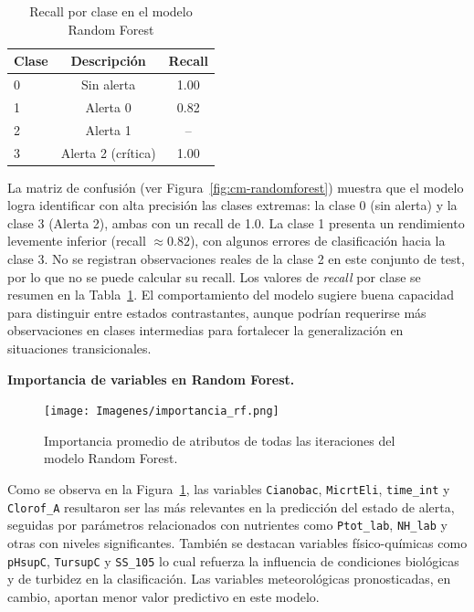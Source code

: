 \documentclass[11pt]{report}
\begin{document}
\begin{table}[H]
\centering
\caption{Recall por clase en el modelo Random Forest}
\label{tab:recall-rf}
\begin{tabular}{lcc}
\toprule
\textbf{Clase} & \textbf{Descripción} & \textbf{Recall} \\
\midrule
0 & Sin alerta           & 1.00 \\
1 & Alerta 0          & 0.82 \\
2 & Alerta 1         & -- \\
3 & Alerta 2 (crítica) & 1.00 \\
\bottomrule
\end{tabular}
\end{table}

La matriz de confusión (ver Figura~\ref{fig:cm-randomforest}) muestra que el modelo logra identificar con alta precisión las clases extremas: la clase 0 (sin alerta) y la clase 3 (Alerta 2), ambas con un recall de 1.0. La clase 1 presenta un rendimiento levemente inferior (recall $\approx 0.82$), con algunos errores de clasificación hacia la clase 3. No se registran observaciones reales de la clase 2 en este conjunto de test, por lo que no se puede calcular su recall. Los valores de \textit{recall} por clase se resumen en la Tabla~\ref{tab:recall-rf}. El comportamiento del modelo sugiere buena capacidad para distinguir entre estados contrastantes, aunque podrían requerirse más observaciones en clases intermedias para fortalecer la generalización en situaciones transicionales.

\textbf{Importancia de variables en Random Forest.}

\begin{figure}[H]
    \centering
    \texttt{[image: Imagenes/importancia\_rf.png]}
    \caption{Importancia promedio de atributos de todas las iteraciones del modelo Random Forest.}
    \label{fig:importancia-rf}
\end{figure}

Como se observa en la Figura~\ref{fig:importancia-rf}, las variables \texttt{Cianobac}, \texttt{MicrtEli}, \texttt{time{\_}int}  y \texttt{Clorof{\_}A} resultaron ser las más relevantes en la predicción del estado de alerta, seguidas por parámetros relacionados con nutrientes como \texttt{Ptot{\_}lab}, \texttt{NH{\_}lab} y otras con niveles significantes. También se destacan variables físico-químicas como \texttt{pHsupC}, \texttt{TursupC} y  \texttt{SS{\_}105} lo cual refuerza la influencia de condiciones biológicas y de turbidez en la clasificación. Las variables meteorológicas pronosticadas, en cambio, aportan menor valor predictivo en este modelo.
\end{document}
